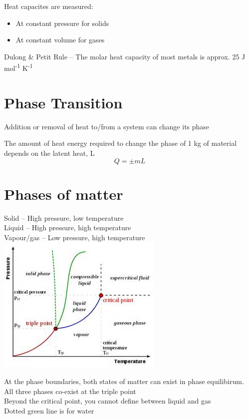 \documentclass[a4paper, 11pt, fleqn, normalem]{report}
\begin{document}
Heat capacites are measured:
\begin{itemize}
    \item[] At constant pressure for solids
    \item[] At constant volume for gases
\end{itemize}
Dulong \& Petit Rule -- The molar heat capacity of most metals is approx. 25 J mol\textsuperscript{-1} K\textsuperscript{-1}

\section{Phase Transition}
Addition or removal of heat to/from a system can change its phase

The amount of heat energy required to change the phase of 1 kg of material depends on the latent heat, L
\begin{equation*}
    Q = \pm mL
\end{equation*}

\section{Phases of matter}
Solid -- High pressure, low temperature \\
Liquid -- High pressure, high temperature \\
Vapour/gas -- Low pressure, high temperature \\
\includegraphics{MatterPhases.jpg}

At the phase boundaries, both states of matter can exist in phase equilibirum. \\
All three phases co-exist at the triple point \\
Beyond the critical point, you cannot define between liquid and gas \\
Dotted green line is for water
\end{document}

